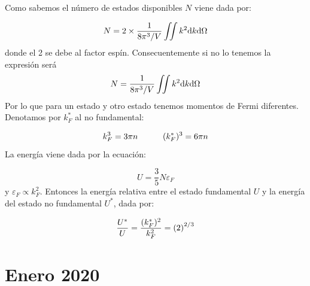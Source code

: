 \begin{solucion}
	Como sabemos el número de estados disponibles $N$ viene dada por: 
	
	\begin{equation*}
		N = 2 \times \frac{1}{8\pi^3/ V} \iint k^2 \mathrm{d} k \mathrm{d} \Omega
	\end{equation*}
	donde el 2 se debe al factor espín. Consecuentemente si no lo tenemos la expresión será
	\begin{equation*}
		N = \frac{1}{8\pi^3/V} \iint k^2 \mathrm{d} k \mathrm{d} \Omega
	\end{equation*}
	Por lo que para un estado y otro estado tenemos momentos de Fermi diferentes. Denotamos por $k_F^*$ al no fundamental:
	
	\begin{equation*}
		k_F^3 = 3\pi n \quad \quad \quad (k_F^*)^3 = 6 \pi n
	\end{equation*}
	La energía viene dada por la ecuación:
	
	\begin{equation*}
		U = \frac{3}{5} N \varepsilon_F
	\end{equation*}
	y $\varepsilon_F\propto k_F^2$. Entonces la energía relativa entre el estado fundamental $U$ y la energía del estado no fundamental $U^*$, dada por:
	
	\begin{equation}
		\frac{U^*}{U} = \frac{(k_F^*)^2}{k_F^2} = \left( 2 \right)^{2/3} 
	\end{equation}
	
\end{solucion}	



\newpage


\section*{Enero 2020}
\setcounter{section}{3} %

